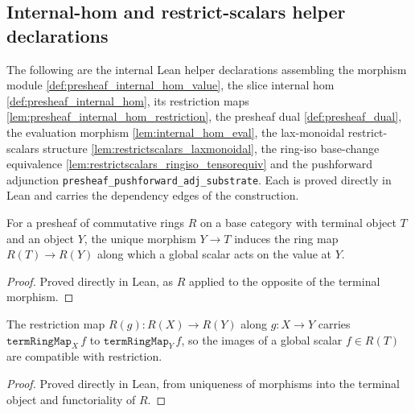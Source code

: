 \subsection{Internal-hom and restrict-scalars helper declarations}
\label{subsec:tensorobj_internalhom_helpers}

The following are the internal Lean helper declarations assembling the morphism
module \cref{def:presheaf_internal_hom_value}, the slice internal hom
\cref{def:presheaf_internal_hom}, its restriction maps
\cref{lem:presheaf_internal_hom_restriction}, the presheaf dual
\cref{def:presheaf_dual}, the evaluation morphism \cref{lem:internal_hom_eval}, the
lax-monoidal restrict-scalars structure \cref{lem:restrictscalars_laxmonoidal}, the
ring-iso base-change equivalence \cref{lem:restrictscalars_ringiso_tensorequiv} and
the pushforward adjunction \texttt{presheaf\_pushforward\_adj\_substrate}. Each is
proved directly in Lean and carries the dependency edges of the construction.

\begin{definition}
  \label{def:term_ring_map}
  For a presheaf of commutative rings \(R\) on a base category with terminal object
  \(T\) and an object \(Y\), the unique morphism \(Y \to T\) induces the ring map
  \(R(T) \to R(Y)\) along which a global scalar acts on the value at \(Y\).
\end{definition}
\begin{proof}
  \leanok
  Proved directly in Lean, as \(R\) applied to the opposite of the terminal morphism.
\end{proof}

\begin{lemma}
  \label{lem:term_ring_map_naturality}
  The restriction map \(R(g) : R(X) \to R(Y)\) along \(g : X \to Y\) carries
  \(\mathtt{termRingMap}_X\,f\) to \(\mathtt{termRingMap}_Y\,f\), so the images of a
  global scalar \(f \in R(T)\) are compatible with restriction.
\end{lemma}
\begin{proof}
  \leanok
  Proved directly in Lean, from uniqueness of morphisms into the terminal object and
  functoriality of \(R\).
\end{proof}

